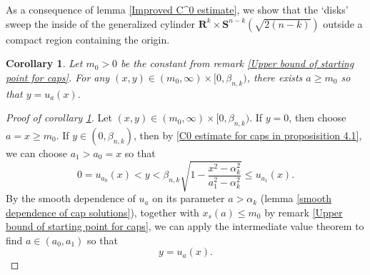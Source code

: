 \documentclass[pdflatex,sn-mathphys-num]{sn-jnl}
\newtheorem{corollary}[theorem]{Corollary}
\begin{document}
As a consequence of lemma \ref{Improved C^0 estimate}, we show that the `disks' sweep the inside of the generalized cylinder $\mathbf{R}^k \times \mathbf{S}^{n-k}(\sqrt{2(n-k)})$ outside a compact region containing the origin.
\begin{corollary}\label{sweeping out by caps}
    Let $m_0 > 0$ be the constant from remark \ref{Upper bound of starting point for caps}. For any $(x,y) \in (m_0, \infty) \times [0, \beta_{n,k})$, there exists $a \geq m_0$ so that $y = u_a(x).$
    
\end{corollary}
\begin{proof}[Proof of corollary \ref{sweeping out by caps}]
    Let $(x,y) \in (m_0, \infty) \times [0, \beta_{n,k})$. If $y = 0$, then choose $a = x \geq m_0$. If $y \in (0, \beta_{n,k})$, then by \eqref{C0 estimate for caps in proposisition 4.1}, we can choose $a_1 > a_0 = x$ so that
\begin{equation}
     0 = u_{a_0}(x)< y < \beta_{n,k}\sqrt{1 - \frac{x^2 - \alpha_k^2}{a_1^2 - \alpha_k^2}} \leq u_{a_1}(x).
\end{equation}
    By the smooth dependence of $u_a$ on its parameter $a > \alpha_k$ (lemma \ref{smooth dependence of cap solutions}), together with $x_{s}(a) \leq m_0$ by remark \ref{Upper bound of starting point for caps}, we can apply the intermediate value theorem to find $a \in (a_0, a_1)$ so that
    $$y = u_a(x).$$
\end{proof}
\end{document}

